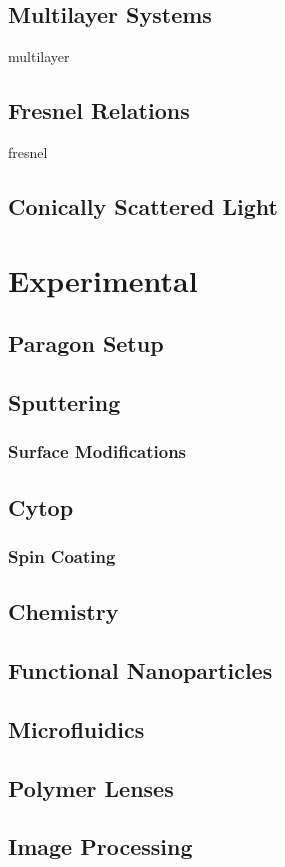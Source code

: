 \documentclass[a4paper,titlepage,onecolumn]{report}
\begin{document}
 \section{Multilayer Systems}
 {multilayer}
 \section{Fresnel Relations}
 {fresnel}
 \section{Conically Scattered Light}

\chapter{Experimental} \label{ch:experimental}
 \section{Paragon Setup}
 \section{Sputtering}
  \subsection{Surface Modifications}
 \section{Cytop}
  \subsection{Spin Coating}
 \section{Chemistry}
 \section{Functional Nanoparticles}
 \section{Microfluidics}
 \section{Polymer Lenses}
 \section{Image Processing}
\end{document}
